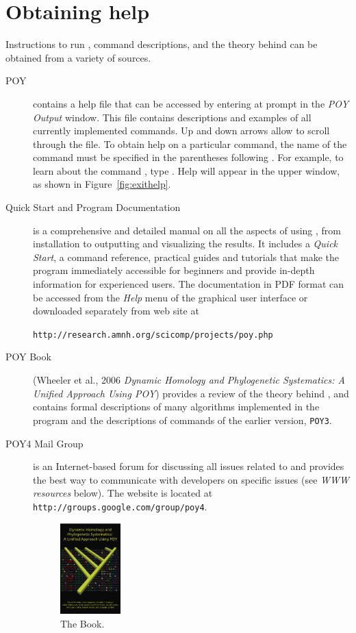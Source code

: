 \section{Obtaining help} \label{sec:help}
Instructions to run \poy, command descriptions, and the theory behind \poy can be obtained from a variety of sources.
\begin{description}
\item[POY] contains a help file that can be accessed by entering  at \poy prompt in the \emph{POY Output} window. This file contains descriptions and examples of all currently implemented \poy commands. Up and down arrows allow to scroll through the file. To obtain help on a particular command, the name of the command must be specified in the parentheses following . For example, to learn about the command , type . Help will appear in the upper window, as shown in Figure~\ref{fig:exithelp}.
\item[Quick Start and Program Documentation] is a comprehensive and detailed manual on all the aspects of using \poy, from installation to outputting and visualizing the results. It includes a \emph{Quick Start}, a \poy command reference, practical guides and tutorials that make the program immediately accessible for beginners and provide in-depth information for experienced users. The documentation in PDF format can be accessed from the \emph{Help} menu of the graphical user interface or downloaded separately from \poy web site at
\begin{center}
\texttt{http://research.amnh.org/scicomp/projects/poy.php}
\end{center}
\item[POY Book] (Wheeler et al., 2006 \emph{Dynamic Homology and Phylogenetic Systematics: A Unified Approach Using POY}) provides a review of the theory behind \poy, and contains formal descriptions of many algorithms implemented in the program and the descriptions of commands of the earlier version, \texttt{POY3}.
\item[POY4 Mail Group] is an Internet-based forum for discussing all issues related to \poy and provides the best way to communicate with \poy developers on specific issues (see \emph{WWW resources} below). The website is located at \texttt{http://groups.google.com/group/poy4}.
\begin{figure}[htbp]
   \centering
   \includegraphics[width=0.23\textwidth]{figures/figPOYBook.jpg}
   \caption{The \poy Book.}
   \label{fig:figprocess}
\end{figure}
\end{description}


